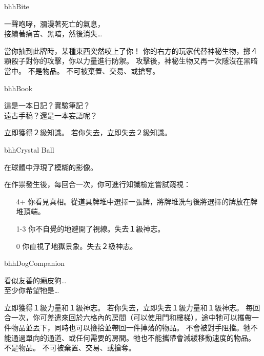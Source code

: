 %
\begin{OmenCard}{bhh}{Bite}{}
  \begin{CardStory}
    一聲咆哮，瀰漫著死亡的氣息，\\
    接續著痛苦、黑暗，然後消失…
  \end{CardStory}
  當你抽到此牌時，某種東西突然咬上了你！\smallbreak
  你的右方的玩家代替神秘生物，擲４顆骰子對你的攻擊，你以力量進行防禦。\smallbreak
  攻擊後，神秘生物又再一次隱沒在黑暗當中。\smallbreak
  \ThisName{}不是物品。\smallbreak
  \ThisName{}不可被棄置、交易、或搶奪。\smallbreak
\end{OmenCard}%
\linebreak[0]%
\begin{OmenCard}{bhh}{Book}{}
  \begin{CardStory}
    這是一本日記？實驗筆記？\\
    遠古手稿？還是一本妄語呢？
  \end{CardStory}
  立即獲得２級知識。\smallbreak
  若你失去\ThisName{}，立即失去２級知識。\smallbreak
\end{OmenCard}%
\linebreak[0]%
\begin{OmenCard}{bhh}{Crystal Ball}{}
  \begin{CardStory}
    在球體中浮現了模糊的影像。
  \end{CardStory}
  在作祟發生後，每回合一次，你可進行知識檢定嘗試窺視\ThisName{}：
  \begin{itemize}
    \item[4+] 你看見真相。從道具牌堆中選擇一張牌，將牌堆洗勻後將選擇的牌放在牌堆頂端。
    \item[1-3] 你不自覺的地避開了視線。失去１級神志。
    \item[0] 你直視了地獄景象。失去２級神志。
  \end{itemize}
\end{OmenCard}%
\linebreak[0]%
\begin{OmenCard}{bhh}{Dog}{Companion}
  \begin{CardStory}
    看似友善的癩皮狗…\\
    至少你希望牠是…
  \end{CardStory}
  立即獲得１級力量和１級神志。\smallbreak
  若你失去\ThisName{}，立即失去１級力量和１級神志。\smallbreak
  每回合一次，你可差遣\ThisName{}來回於六格內的房間（可以使用門和樓梯），途中牠可以攜帶一件物品並丟下，同時也可以撿拾並帶回一件掉落的物品。\smallbreak
  \ThisName{}不會被對手阻擋。牠不能通過單向的通道、或任何需要\RollAny{}的房間。牠也不能攜帶會減緩移動速度的物品。\smallbreak
  \ThisName{}不是物品。\smallbreak
  \ThisName{}不可被棄置、交易、或搶奪。\smallbreak
\end{OmenCard}%
